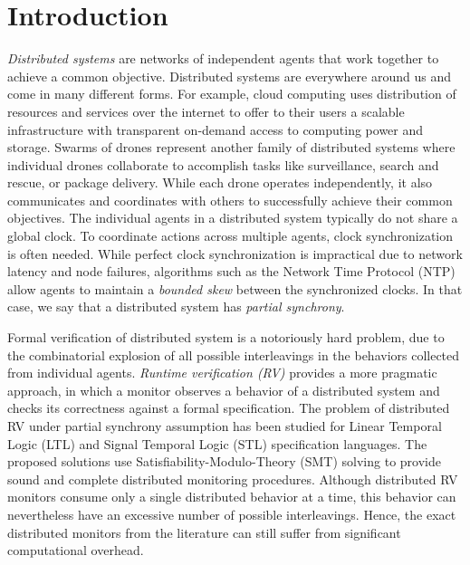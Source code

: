 \section{Introduction} \label{sec:introduction}

\emph{Distributed systems} are networks of independent agents that work together to achieve a common objective. Distributed systems are everywhere around us and come in many different forms. For example, cloud computing uses distribution of resources and services over the internet to offer to their users a scalable infrastructure with transparent on-demand access to computing power and storage. Swarms of drones represent another family of distributed systems where individual drones collaborate  to accomplish tasks like surveillance, search and rescue, or package delivery. While each drone operates independently,  it also communicates and coordinates with others to successfully achieve their common objectives. The individual agents in a distributed system typically do not share a global clock. To coordinate actions across multiple agents, clock synchronization is often needed. While perfect clock synchronization is impractical due to network latency and node failures, algorithms such as the Network Time Protocol (NTP) allow agents to maintain a \emph{bounded skew} between the synchronized clocks. In that case, we say that a distributed system has \emph{partial synchrony}. 

Formal verification of distributed system is a notoriously hard problem, due to the combinatorial explosion of all possible interleavings in the behaviors collected from individual agents. \emph{Runtime verification (RV)} provides a more pragmatic approach, in which a monitor observes a behavior of a distributed system and checks its correctness against a formal specification. The problem of distributed RV under partial synchrony assumption has been studied for Linear Temporal Logic (LTL) and Signal Temporal Logic (STL) specification languages. The proposed solutions use Satisfiability-Modulo-Theory (SMT) solving to provide sound and complete distributed monitoring procedures. Although distributed RV monitors consume only a single distributed behavior at a time, this behavior can nevertheless have an excessive number of possible interleavings. Hence, the exact distributed monitors from the literature can still suffer from significant computational overhead. 

